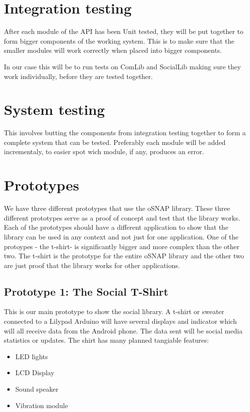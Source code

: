 \section{Integration testing}
After each module of the API has been Unit tested, they will be put together to form bigger components 
of the working system. This is to make sure that the smaller modules will work correctly when placed 
into bigger components. 

In our case this will be to run tests on ComLib and SocialLib making sure they work individually, 
before they are tested together.

\section{System testing}
This involves butting the components from integration testing together to form a complete system that 
can be tested. Preferably each module will be added incrementaly, to easier spot wich module, if any, 
produces an error.

\section{Prototypes}
We have three different prototypes that use the oSNAP library. These three different prototypes serve
as a proof of concept and test that the library works. Each of the prototypes should have a different
application to show that the library can be used in any context and not just for one application. One of
the protoypes - the t-shirt- is significantly bigger and more complex than the other two. The t-shirt
is the prototype for the entire oSNAP library and the other two are just proof that the library works
for other applications.

\subsection{Prototype 1: The Social T-Shirt}
This is our main prototype to show the social library. A t-shirt or sweater connected to a Lilypad Arduino will have
several displays and indicator which will all receive data from the Android phone. The data sent will be social media 
statistics or updates. The shirt has many planned tangiable features:
\begin{itemize}
\item LED lights
\item LCD Display
\item Sound speaker
\item Vibration module
\end{itemize}

